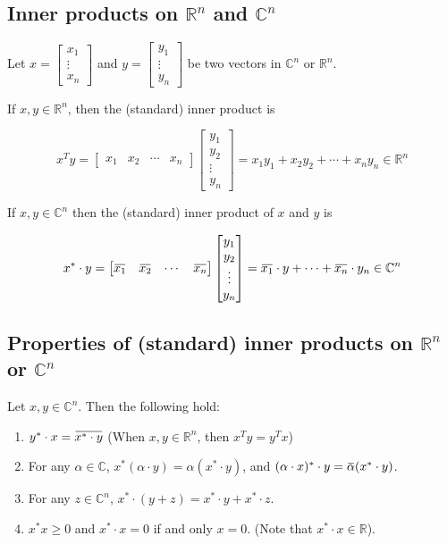 \documentclass[12pt]{article}
\newcommand{\overbar}[1]{\mkern 1.5mu\overline{\mkern-1.5mu#1\mkern-1.5mu}\mkern 1.5mu}
\theoremstyle{definition}
\begin{document}
\subsection{Inner products on $\mathbb{R}^n$ and $\mathbb{C}^n$}

Let $x = \begin{bmatrix} x_1 \\ \vdots \\ x_n \end{bmatrix}$ and
$y = \begin{bmatrix} y_1 \\ \vdots \\ y_n \end{bmatrix}$ be two vectors in $\mathbb{C}^n$
or $\mathbb{R}^n$.

\noindent If $x, y \in \mathbb{R}^n$, then the (standard) inner product is

\[
x^T y = \begin{bmatrix} x_1 & x_2 & \cdots & x_n \end{bmatrix}
\begin{bmatrix} y_1 \\ y_2 \\ \vdots \\ y_n \end{bmatrix} =
x_1 y_1 + x_2 y_2 + \cdots + x_n y_n \in \mathbb{R}^n
\]

\noindent If $x, y \in \mathbb{C}^n$ then the (standard) inner product of $x$ and $y$ is

\[
x^* \cdot y = \begin{bmatrix} \overbar{x_1} & \overbar{x_2} & \cdots & \overbar{x_n} \end{bmatrix}
\begin{bmatrix} y_1 \\ y_2 \\ \vdots \\ y_n \end{bmatrix} = \overbar{x_1} \cdot y + \cdots +
\overbar{x_n} \cdot y_n \in \mathbb{C}^n
\]

\subsection{Properties of (standard) inner products on $\mathbb{R}^n$ or $\mathbb{C}^n$}

Let $x, y \in \mathbb{C}^n$. Then the following hold:

\begin{enumerate}[label = (\arabic*)]
\item $y^* \cdot x = \overbar{x^* \cdot y}$
(When $x, y \in \mathbb{R}^n$, then $x^T y = y^T x$)

\item For any $\alpha \in \mathbb{C}$, $x^* (\alpha \cdot y) = \alpha (x^* \cdot y)$, and
$(\alpha \cdot x)^* \cdot y = \overbar{\alpha}(x^* \cdot y)$.

\item For any $z \in \mathbb{C}^n$, $x^* \cdot (y + z) = x^* \cdot y + x^* \cdot z$.

\item $x^* x \geq 0$ and $x^* \cdot x = 0$ if and only $x = 0$. 
(Note that $x^* \cdot x \in \mathbb{R}$).
\end{enumerate}
\end{document}
